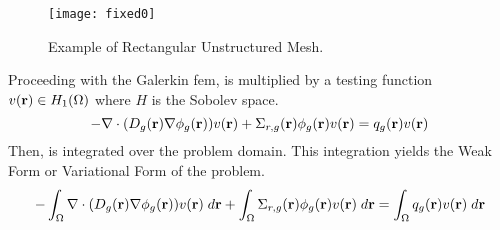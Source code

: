     \begin{figure}%
      \centering
      \texttt{[image: fixed0]}
      \caption{Example of Rectangular Unstructured Mesh.}
      \label{fig:fixed0}
    \end{figure}
  

    Proceeding with the Galerkin \gls{fem},  is
    multiplied by a testing function $v(\mathbf{r}) \in H_1(\Omega)$ where $H$ is the
    Sobolev space. 
    \begin{equation}
      \label{eq:testing_function_multiply}
      -\mathbf{\nabla} \cdot (D_g(\mathbf{r}) \mathbf{\nabla} \phi_g(\mathbf{r})) v(\mathbf{r}) + 
        \Sigma_{r,g}(\mathbf{r}) \phi_g(\mathbf{r}) v(\mathbf{r}) =
        q_g(\mathbf{r}) v(\mathbf{r})
    \end{equation}
    Then,  is integrated over the problem 
    domain. This integration yields the Weak Form or Variational Form of the 
    problem.
    \begin{equation}
      \label{eq:fem_weak_form}
      - \int_{\Omega} \mathbf{\nabla} \cdot (D_g(\mathbf{r}) \mathbf{\nabla} \phi_g(\mathbf{r})) v(\mathbf{r}) \; d\mathbf{r}
        + \int_{\Omega} \Sigma_{r,g}(\mathbf{r}) \phi_g(\mathbf{r}) v(\mathbf{r}) \;d\mathbf{r}=
        \int_{\Omega} q_g(\mathbf{r}) v(\mathbf{r}) \;d\mathbf{r}
    \end{equation}
    
